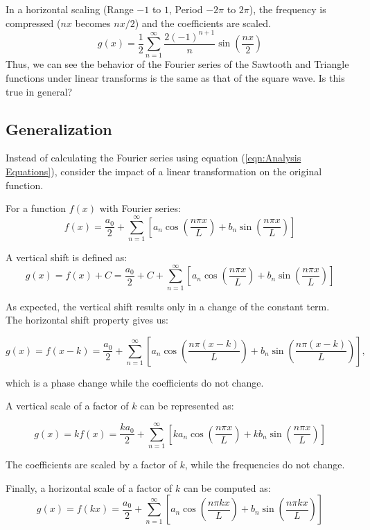 \documentclass{article}
\begin{document}
In a horizontal scaling (Range $-1$ to $1$, Period $-2\pi$ to $2\pi$), the frequency is compressed ($nx$ becomes $nx/2$) and the coefficients are scaled.
$$g(x) = \frac{1}{2}\sum_{n=1}^{\infty} \frac{2(-1)^{n+1}}{n} \sin\left(\frac{nx}{2}\right)$$
Thus, we can see the behavior of the Fourier series of the Sawtooth and Triangle functions under linear transforms is the same as that of the square wave. Is this true in general?
\vspace{0.2in}

\subsection{Generalization}
Instead of calculating the Fourier series using equation (\ref{eqn:Analysis Equations}), consider the impact of a linear transformation on the original function.  
\vspace{0.2in}

For a function $f(x)$ with Fourier series: 
$$f(x) = \frac{a_0}{2} + \sum_{n=1}^{\infty} \left[a_n \cos\left(\frac{n\pi x}{L}\right) + b_n \sin\left(\frac{n\pi x}{L}\right)\right]$$

A vertical shift is defined as:
$$g(x) = f(x)+ C = \frac{a_0}{2}+ C + \sum_{n=1}^{\infty}\left [a_n \cos\left(\frac{n\pi x}{L}\right) + b_n \sin\left(\frac{n\pi x}{L}\right)\right]$$

As expected, the vertical shift results only in a change of the constant term. \\

The horizontal shift property gives us:

$$g(x) = f(x-k) = \frac{a_0}{2} + \sum_{n=1}^{\infty}\left [a_n \cos\left(\frac{n\pi (x-k)}{L}\right) + b_n \sin\left(\frac{n\pi (x-k)}{L}\right)\right],$$

which is a phase change while the coefficients do not change.
\vspace{0.2in}

A vertical scale of a factor of $k$ can be represented as:

$$g(x) = kf(x) = \frac{ka_0}{2} + \sum_{n=1}^{\infty} \left[ ka_n \cos\left(\frac{n\pi x}{L}\right) + kb_n \sin\left(\frac{n\pi x}{L}\right) \right]$$

The coefficients are scaled by a factor of $k$, while the frequencies do not change.
\vspace{0.2in}

Finally, a horizontal scale of a factor of $k$ can be computed as:
$$g(x) = f(kx) = \frac{a_0}{2} + \sum_{n=1}^{\infty} \left[ a_n \cos\left(\frac{n\pi kx}{L}\right) + b_n \sin\left(\frac{n\pi kx}{L}\right) \right]$$
\end{document}
